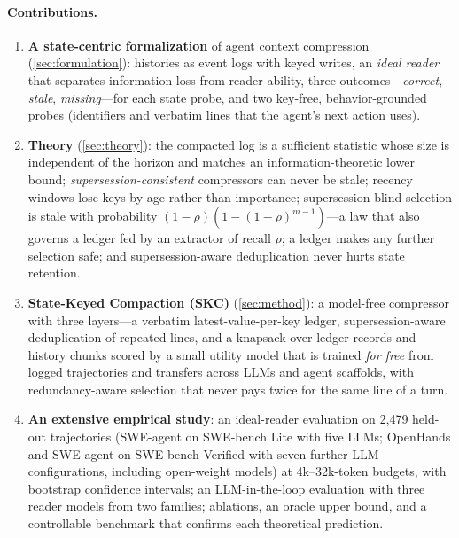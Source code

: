 \paragraph{Contributions.}
\begin{enumerate}[leftmargin=*,itemsep=1pt,topsep=2pt]
  \item \textbf{A state-centric formalization} of agent context compression
  (\cref{sec:formulation}): histories as event logs with keyed writes, an
  \emph{ideal reader} that separates information loss from reader ability,
  three outcomes---\emph{correct}, \emph{stale}, \emph{missing}---for each state
  probe, and two key-free, behavior-grounded probes (identifiers and verbatim
  lines that the agent's next action uses).
  \item \textbf{Theory} (\cref{sec:theory}): the compacted log is a sufficient
  statistic whose size is independent of the horizon and matches an
  information-theoretic lower bound; \emph{supersession-consistent} compressors
  can never be stale; recency windows lose keys by age rather than importance;
  supersession-blind selection is stale with probability
  $(1-\rho)(1-(1-\rho)^{m-1})$---a law that also governs a ledger fed by an
  extractor of recall $\rho$; a ledger makes any further selection safe; and
  supersession-aware deduplication never hurts state retention.
  \item \textbf{State-Keyed Compaction (SKC)} (\cref{sec:method}): a model-free
  compressor with three layers---a verbatim latest-value-per-key ledger,
  supersession-aware deduplication of repeated lines, and a knapsack over ledger
  records and history chunks scored by a small utility model that is trained
  \emph{for free} from logged trajectories and transfers across LLMs and agent
  scaffolds, with redundancy-aware selection that never pays twice for the
  same line of a turn.
  \item \textbf{An extensive empirical study}: an ideal-reader evaluation on
  2{,}479 held-out trajectories (SWE-agent on SWE-bench Lite with five LLMs;
  OpenHands and SWE-agent on SWE-bench Verified with seven further LLM
  configurations, including open-weight models) at 4k--32k-token budgets, with
  bootstrap confidence intervals; an LLM-in-the-loop evaluation with three
  reader models from two families; ablations, an oracle upper bound, and a
  controllable benchmark that confirms each theoretical prediction.
\end{enumerate}

